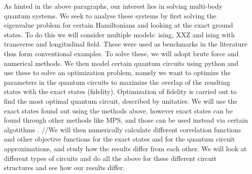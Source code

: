 \documentclass{physics_article}
\begin{document}
	As hinted in the above paragraphs, our interest lies in solving multi-body quantum systems. We seek to analyse these systems by first solving the eigenvalue problem for certain Hamiltonians and looking at the exact ground states. To do this we will consider multiple models: ising, XXZ and ising with transverse and longitudinal field. These were used as benchmarks in the literature \cite{PhysRevResearch.4.L022020,PRXQuantum.2.010342,PhysRevResearch.4.033118} thus form conventional examples. To solve these, we will adopt brute force and numerical methods. We then model certain quantum circuits using python and use these to solve an optimization problem, namely we want to optimize the parameters in the quantum circuits to maximize the overlap of the reuslting states with the exact states (fidelity). Optimization of fidelity is carried out to find the most optimal quantum circuit, described by unitaties. We will use the exact states found out using the methods above, however exact states can be found through other methods like MPS, and those can be used instead via certain algotithms \cite{PRXQuantum.2.010342}. //We will then numerically calculate different correlation functions and other objective functions for the exact states and for the quantum circuit approximations, and study how the results differ from each other. We will look at different types of circuits and do all the above for these different circuit structures and see how our results differ.
\end{document}
